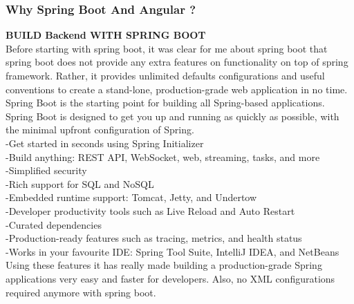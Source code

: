 \documentclass{scrartcl}
\begin{document}
\subsubsection{Why Spring Boot And Angular ?}
\textbf{BUILD Backend WITH SPRING BOOT}\\
Before starting with spring boot, it was clear for me about spring boot that spring boot does not provide any extra features on functionality on top of spring framework. Rather, it provides unlimited defaults configurations and useful conventions to create a stand-lone, production-grade web application in no time.\\
Spring Boot is the starting point for building all Spring-based applications. Spring Boot is designed to get you up and running as quickly as possible, with the minimal upfront configuration of Spring.\\
 -Get started in seconds using Spring Initializer\\
-Build anything: REST API, WebSocket, web, streaming, tasks, and more\\
-Simplified security\\
-Rich support for SQL and NoSQL\\
-Embedded runtime support: Tomcat, Jetty, and Undertow\\
-Developer productivity tools such as Live Reload and Auto Restart\\
-Curated dependencies\\
-Production-ready features such as tracing, metrics, and health status\\
-Works in your favourite IDE: Spring Tool Suite, IntelliJ IDEA, and NetBeans\\

Using these features it has really made building a production-grade Spring applications very easy and faster for developers. Also, no XML configurations required anymore with spring boot.\\
\end{document}
